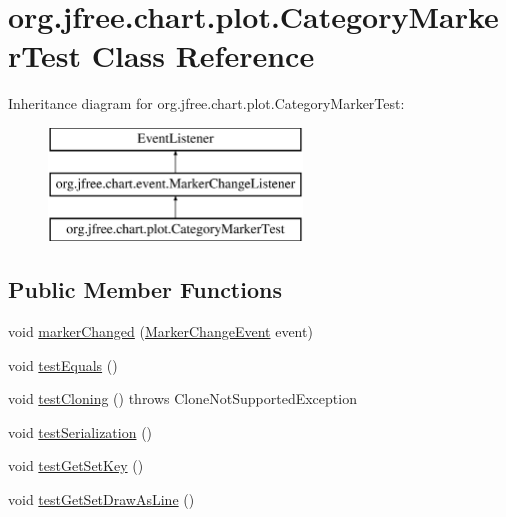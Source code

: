 \hypertarget{classorg_1_1jfree_1_1chart_1_1plot_1_1_category_marker_test}{}\section{org.\+jfree.\+chart.\+plot.\+Category\+Marker\+Test Class Reference}
\label{classorg_1_1jfree_1_1chart_1_1plot_1_1_category_marker_test}
Inheritance diagram for org.\+jfree.\+chart.\+plot.\+Category\+Marker\+Test\+:\begin{figure}[H]
\begin{center}
\leavevmode
\includegraphics[height=3.000000cm]{classorg_1_1jfree_1_1chart_1_1plot_1_1_category_marker_test}
\end{center}
\end{figure}
\subsection*{Public Member Functions}
\begin{DoxyCompactItemize}
\item 
void \mbox{\hyperlink{classorg_1_1jfree_1_1chart_1_1plot_1_1_category_marker_test_aa5b6c0ae6a4ff14acf794812d66db245}{marker\+Changed}} (\mbox{\hyperlink{classorg_1_1jfree_1_1chart_1_1event_1_1_marker_change_event}{Marker\+Change\+Event}} event)
\item 
void \mbox{\hyperlink{classorg_1_1jfree_1_1chart_1_1plot_1_1_category_marker_test_a4c1589fba80477aee4d4e5e61a7aae2b}{test\+Equals}} ()
\item 
void \mbox{\hyperlink{classorg_1_1jfree_1_1chart_1_1plot_1_1_category_marker_test_ad0413841f58a194616ce4d451ea38a32}{test\+Cloning}} ()  throws Clone\+Not\+Supported\+Exception 
\item 
void \mbox{\hyperlink{classorg_1_1jfree_1_1chart_1_1plot_1_1_category_marker_test_a7b38827722959a71264196c5dd6bc47a}{test\+Serialization}} ()
\item 
void \mbox{\hyperlink{classorg_1_1jfree_1_1chart_1_1plot_1_1_category_marker_test_a85f363a198b6ea23dee49e17cfacf379}{test\+Get\+Set\+Key}} ()
\item 
void \mbox{\hyperlink{classorg_1_1jfree_1_1chart_1_1plot_1_1_category_marker_test_a9dfb3aa8a2c32806c9c7f6e7c2223038}{test\+Get\+Set\+Draw\+As\+Line}} ()
\end{DoxyCompactItemize}


